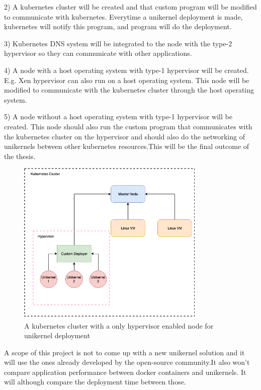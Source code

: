 2) A kubernetes cluster will be created and that custom program will be modified to communicate with kubernetes. Everytime a unikernel deployment is made, kubernetes will notify this program, and program will do the deployment.

3) Kubernetes DNS system will be integrated to the node with the type-2 hypervisor so they can communicate with other applications.

4) A node with a host operating system with type-1 hypervisor will be created. E.g. Xen hypervisor can also run on a host operating system. This node will be modified to communicate with the kubernetes cluster through the host operating system. 

5) A node without a host operating system with type-1 hypervisor will be created. This node should also run the custom program that communicates with the kubernetes cluster on the hypervisor and should also do the networking of unikernels between other kubernetes resources.This will be the final outcome of the thesis.

\begin{figure}[htpb]
  \centering
  \includegraphics[width=0.8\textwidth]{figures/arch3.png}
  \caption{A kubernetes cluster with a only hypervisor enabled node for unikernel deployment} \label{fig:hypervisor}
\end{figure}


A scope of this project is not to come up with a new unikernel solution and it will use the ones already developed by the open-source community.It also won't compare application performance between docker containers and unikernels. It will although compare the deployment time between those.

